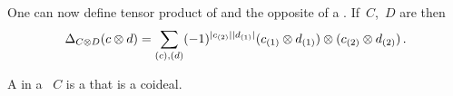 \documentclass[a4paper,10pt,headings=standardclasses]{scrartcl}
\begin{document}

\begin{remark}
One can now define tensor product of {\dgcs} and the opposite of a {\dgc}.
If~$C$,~$D$ are {\dgcs} then
\[
  \Delta_{C \otimes D}(c \otimes d)
  =
  \sum_{(c), (d)}
  (-1)^{\lvert c_{(2)}\rvert \lvert d_{(1)}\rvert}
  (c_{(1)} \otimes d_{(1)}) \otimes (c_{(2)} \otimes d_{(2)}) \,.
\]
\end{remark}


\begin{definition}
  A  in a {\dgc}~$C$ is a {\dgsub} that is a coideal.
\end{definition}
\end{document}
